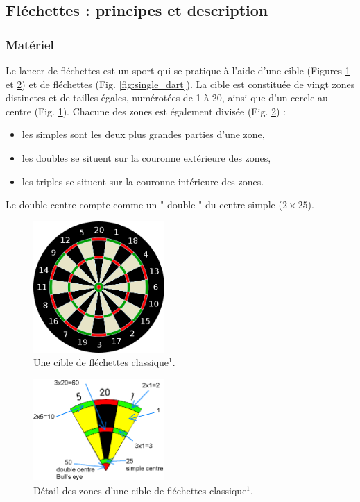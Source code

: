 \subsection{Fléchettes : principes et description}
\subsubsection{Matériel}
Le lancer de fléchettes est un sport qui se pratique à l'aide d'une cible (Figures \ref{fig:darts_target} et \ref{fig:darts_zone}) et de fléchettes (Fig. \ref{fig:single_dart}). La cible est constituée de vingt zones distinctes et de tailles égales, numérotées de 1 à 20, ainsi que d'un cercle au centre (Fig. \ref{fig:darts_target}). Chacune des zones est également divisée (Fig. \ref{fig:darts_zone}) :

\begin{itemize}
	\item les simples sont les deux plus grandes parties d'une zone,
	\item les doubles se situent sur la couronne extérieure des zones,
	\item les triples se situent sur la couronne intérieure des zones.
\end{itemize}

Le double centre compte comme un " double " du centre simple ($2 \times 25$).

\begin{figure}
    \centering
    \includegraphics[width=5cm]{pictures/darts_target.png}
    \caption[Cible de fléchettes]{Une cible de fléchettes classique$^1$.}
    \label{fig:darts_target}
\end{figure}

\begin{figure}
    \centering
    \includegraphics[width=5cm]{pictures/darts_zone.png}
    \caption[Zones d'une cible de fléchettes]{Détail des zones d'une cible de fléchettes classique$^1$.}
    \label{fig:darts_zone}
\end{figure}

